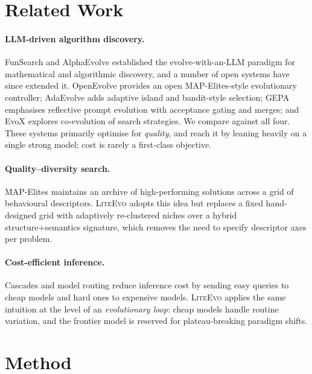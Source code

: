 \documentclass[10pt,twocolumn]{article}
\newcommand{\liteevo}{\textsc{LiteEvo}}
\begin{document}
\section{Related Work}
\label{sec:related}

\paragraph{LLM-driven algorithm discovery.}
FunSearch and AlphaEvolve established the evolve-with-an-LLM paradigm for
mathematical and algorithmic discovery, and a number of open systems have since
extended it. OpenEvolve provides an open MAP-Elites-style evolutionary
controller; AdaEvolve adds adaptive island and bandit-style selection; GEPA
emphasises reflective prompt evolution with acceptance gating and merges; and
EvoX explores co-evolution of search strategies. We compare against all four.
These systems primarily optimise for \emph{quality}, and reach it by leaning
heavily on a single strong model; cost is rarely a first-class objective.

\paragraph{Quality--diversity search.}
MAP-Elites maintains an archive of high-performing solutions across a grid of
behavioural descriptors. \liteevo{} adopts this idea but replaces a fixed
hand-designed grid with adaptively re-clustered niches over a hybrid
structure+semantics signature, which removes the need to specify descriptor
axes per problem.

\paragraph{Cost-efficient inference.}
Cascades and model routing reduce inference cost by sending easy queries to
cheap models and hard ones to expensive models. \liteevo{} applies the same
intuition at the level of an \emph{evolutionary loop}: cheap models handle
routine variation, and the frontier model is reserved for plateau-breaking
paradigm shifts.

\section{Method}
\label{sec:method}
\end{document}
